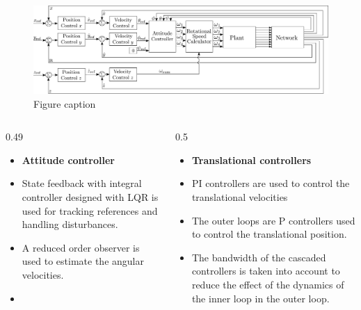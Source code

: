 \vspace{-1cm}
\begin{figure}
	\includegraphics[width=0.88\linewidth]{figures/TranslationalControlDiagram}
	\caption{Figure caption}
\end{figure}

\begin{columns}[t,totalwidth=\twocolwid] %

	\begin{column}{0.49\twocolwid} %
  	 \centering
  	 \hspace{-2cm}
  	 \parbox{.88\textwidth}{
    	 \begin{itemize}
  	 			\item[]\textbf{Attitude controller}\\
  	 			\item State feedback with integral controller designed with LQR is used for tracking references and handling disturbances.
  	 			\item A reduced order observer is used to estimate the angular velocities.
  	 			\item[]\vspace{5pt}
  	 		\end{itemize}
  	 }
	\end{column} %
	\hspace{-4cm}
	\begin{column}{0.5\twocolwid} %
  	 \centering
   	 \parbox{1\textwidth}{
       	 \begin{itemize}
    	 			\item[]\textbf{Translational controllers}\\
     	 			\item PI controllers are used to control the translational velocities
     	 			\item The outer loops are P controllers used to control the translational position.
     	 			\item The bandwidth of the cascaded controllers is taken into account to reduce the effect of the dynamics of the inner loop in the outer loop.
       	 \end{itemize}		
   	 }
	\end{column} %
	\vspace{-.5cm}
\end{columns} %